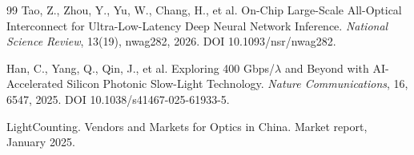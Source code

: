 \documentclass[11pt,openany]{book}
\theoremstyle{remark}
\begin{document}
\begin{thebibliography}{99}
Tao, Z., Zhou, Y., Yu, W., Chang, H., et al.
\newblock On-Chip Large-Scale All-Optical Interconnect for Ultra-Low-Latency Deep Neural Network Inference.
\newblock \emph{National Science Review}, 13(19), nwag282, 2026. DOI 10.1093/nsr/nwag282.

Han, C., Yang, Q., Qin, J., et al.
\newblock Exploring 400 Gbps/$\lambda$ and Beyond with AI-Accelerated Silicon Photonic Slow-Light Technology.
\newblock \emph{Nature Communications}, 16, 6547, 2025. DOI 10.1038/s41467-025-61933-5.

LightCounting.
\newblock Vendors and Markets for Optics in China.
\newblock Market report, January 2025.

\end{thebibliography}
\endgroup
\end{document}
